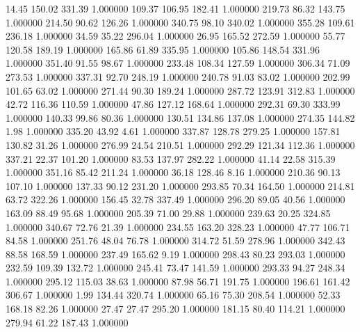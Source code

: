      14.45    150.02    331.39  1.000000
    109.37    106.95    182.41  1.000000
    219.73     86.32    143.75  1.000000
    214.50     90.62    126.26  1.000000
    340.75     98.10    340.02  1.000000
    355.28    109.61    236.18  1.000000
     34.59     35.22    296.04  1.000000
     26.95    165.52    272.59  1.000000
     55.77    120.58    189.19  1.000000
    165.86     61.89    335.95  1.000000
    105.86    148.54    331.96  1.000000
    351.40     91.55     98.67  1.000000
    233.48    108.34    127.59  1.000000
    306.34     71.09    273.53  1.000000
    337.31     92.70    248.19  1.000000
    240.78     91.03     83.02  1.000000
    202.99    101.65     63.02  1.000000
    271.44     90.30    189.24  1.000000
    287.72    123.91    312.83  1.000000
     42.72    116.36    110.59  1.000000
     47.86    127.12    168.64  1.000000
    292.31     69.30    333.99  1.000000
    140.33     99.86     80.36  1.000000
    130.51    134.86    137.08  1.000000
    274.35    144.82      1.98  1.000000
    335.20     43.92      4.61  1.000000
    337.87    128.78    279.25  1.000000
    157.81    130.82     31.26  1.000000
    276.99     24.54    210.51  1.000000
    292.29    121.34    112.36  1.000000
    337.21     22.37    101.20  1.000000
     83.53    137.97    282.22  1.000000
     41.14     22.58    315.39  1.000000
    351.16     85.42    211.24  1.000000
     36.18    128.46      8.16  1.000000
    210.36     90.13    107.10  1.000000
    137.33     90.12    231.20  1.000000
    293.85     70.34    164.50  1.000000
    214.81     63.72    322.26  1.000000
    156.45     32.78    337.49  1.000000
    296.20     89.05     40.56  1.000000
    163.09     88.49     95.68  1.000000
    205.39     71.00     29.88  1.000000
    239.63     20.25    324.85  1.000000
    340.67     72.76     21.39  1.000000
    234.55    163.20    328.23  1.000000
     47.77    106.71     84.58  1.000000
    251.76     48.04     76.78  1.000000
    314.72     51.59    278.96  1.000000
    342.43     88.58    168.59  1.000000
    237.49    165.62      9.19  1.000000
    298.43     80.23    293.03  1.000000
    232.59    109.39    132.72  1.000000
    245.41     73.47    141.59  1.000000
    293.33     94.27    248.34  1.000000
    295.12    115.03     38.63  1.000000
     87.98     56.71    191.75  1.000000
    196.61    161.42    306.67  1.000000
      1.99    134.44    320.74  1.000000
     65.16     75.30    208.54  1.000000
     52.33    168.18     82.26  1.000000
     27.47     27.47    295.20  1.000000
    181.15     80.40    114.21  1.000000
    279.94     61.22    187.43  1.000000
